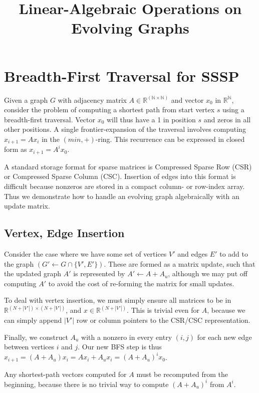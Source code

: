 \documentclass[11pt]{article}
\title{Linear-Algebraic Operations on Evolving Graphs}
\date{}
\begin{document}
\maketitle

\section{Breadth-First Traversal for SSSP}

Given a graph $G$ with adjacency matrix $A \in \mathbb{R^{(N \times N)}}$ and vector $x_0$ in $\mathbb{R^N}$, consider the problem of computing a shortest path from start vertex $s$ using a breadth-first traversal. Vector $x_0$ will thus have a 1 in position $s$ and zeros in all other positions. A single frontier-expansion of the traversal involves computing $x_{i+1} = Ax_i$ in the $(min,+)$-ring. This recurrence can be expressed in closed form as $x_{i+1} = A^i x_0$.

A standard storage format for sparse matrices is Compressed Sparse Row (CSR) or Compressed Sparse Column (CSC). Insertion of edges into this format is difficult because nonzeros are stored in a compact column- or row-index array. Thus we demonstrate how to handle an evolving graph algebraically with an update matrix. 

\subsection{Vertex, Edge Insertion}
Consider the case where we have some set of vertices $V'$ and edges $E'$ to add to the graph $(G' \gets G \cap \{V',E'\})$. These are formed as a matrix update, such that the updated graph $A'$ is represented by $A' \gets A + A_u$, although we may put off computing $A'$ to avoid the cost of re-forming the matrix for small updates.

To deal with vertex insertion, we must simply ensure all matrices to be in $\mathbb{R}^{(N+|V'|)\times(N+|V'|)}$, and $x \in \mathbb{R}^{(N+|V'|)}$. This is trivial even for $A$, because we can simply append $|V'|$ row or column pointers to the CSR/CSC representation.

Finally, we construct $A_u$ with a nonzero in every entry $(i,j)$ for each new edge between vertices $i$ and $j$. Our new BFS step is thus $x_{i+1} = (A+A_u)x_i = Ax_i + A_ux_i = (A+A_u)^ix_0$.

Any shortest-path vectors computed for $A$ must be recomputed from the beginning, because there is no trivial way to compute $(A+A_u)^i$ from $A^i$.
\end{document}
